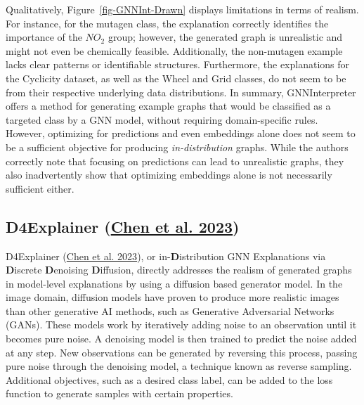 \documentclass[
  11pt,
  letterpaper,
]{article}
\begin{document}
Qualitatively, Figure~\ref{fig-GNNInt-Drawn} displays limitations in
terms of realism. For instance, for the mutagen class, the explanation
correctly identifies the importance of the \(NO_2\) group; however, the
generated graph is unrealistic and might not even be chemically
feasible. Additionally, the non-mutagen example lacks clear patterns or
identifiable structures. Furthermore, the explanations for the Cyclicity
dataset, as well as the Wheel and Grid classes, do not seem to be from
their respective underlying data distributions. In summary,
GNNInterpreter offers a method for generating example graphs that would
be classified as a targeted class by a GNN model, without requiring
domain-specific rules. However, optimizing for predictions and even
embeddings alone does not seem to be a sufficient objective for
producing \emph{in-distribution} graphs. While the authors correctly
note that focusing on predictions can lead to unrealistic graphs, they
also inadvertently show that optimizing embeddings alone is not
necessarily sufficient either.

\hypertarget{d4explainer-chen_wu_gupta_ying_2023}{%
\subsection{\texorpdfstring{D4Explainer
(\protect\hyperlink{ref-Chen_Wu_Gupta_Ying_2023}{Chen et al.
2023})}{D4Explainer (Chen et al. 2023)}}\label{d4explainer-chen_wu_gupta_ying_2023}}

\quad D4Explainer (\protect\hyperlink{ref-Chen_Wu_Gupta_Ying_2023}{Chen
et al. 2023}), or in-\textbf{D}istribution GNN Explanations via
\textbf{D}iscrete \textbf{D}enoising \textbf{D}iffusion, directly
addresses the realism of generated graphs in model-level explanations by
using a diffusion based generator model. In the image domain, diffusion
models have proven to produce more realistic images than other
generative AI methods, such as Generative Adversarial Networks (GANs).
These models work by iteratively adding noise to an observation until it
becomes pure noise. A denoising model is then trained to predict the
noise added at any step. New observations can be generated by reversing
this process, passing pure noise through the denoising model, a
technique known as reverse sampling. Additional objectives, such as a
desired class label, can be added to the loss function to generate
samples with certain properties.
\end{document}
